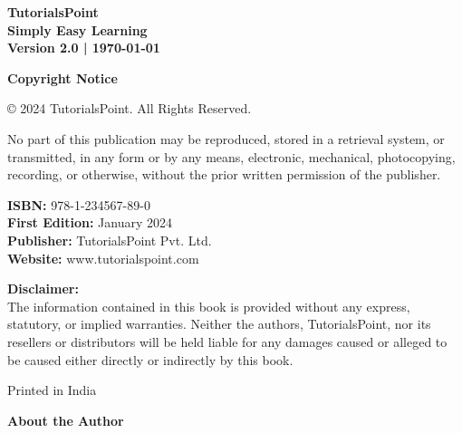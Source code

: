\documentclass[12pt,a4paper,oneside]{book}
\begin{document}
\begin{titlepage}
\begin{center}
        \vfill
        
        \begin{tcolorbox}[
            colback=white,
            coltext=black,
            boxrule=2pt,
            arc=5pt,
            width=10cm,
            center,
            colframe=headerred
        ]
            \centering
            \large\bfseries TutorialsPoint\\[0.2cm]
            \normalsize Simply Easy Learning\\[0.3cm]
            \small Version 2.0 | \today
        \end{tcolorbox}
    \end{center}
\end{titlepage}

\clearpage
\thispagestyle{empty}
\vspace*{3cm}
\begin{center}
    \large\bfseries Copyright Notice
\end{center}

\vspace{1cm}

© 2024 TutorialsPoint. All Rights Reserved.

No part of this publication may be reproduced, stored in a retrieval system, or transmitted, in any form or by any means, electronic, mechanical, photocopying, recording, or otherwise, without the prior written permission of the publisher.

\vspace{1cm}

\textbf{ISBN:} 978-1-234567-89-0\\
\textbf{First Edition:} January 2024\\
\textbf{Publisher:} TutorialsPoint Pvt. Ltd.\\
\textbf{Website:} www.tutorialspoint.com

\vspace{1cm}

\textbf{Disclaimer:}\\
The information contained in this book is provided without any express, statutory, or implied warranties. Neither the authors, TutorialsPoint, nor its resellers or distributors will be held liable for any damages caused or alleged to be caused either directly or indirectly by this book.

\vfill

Printed in India

\clearpage
\thispagestyle{empty}
\vspace*{2cm}
\begin{center}
    \large\bfseries About the Author
\end{center}
\end{document}
